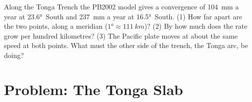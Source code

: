 \begin{exercise}[$\star\star\star$]\label{exo:g11:subduction-zones:15}
Along the Tonga Trench the PB2002 model gives a convergence of
\qty{104}{mm} a year at \ang{23.6}~South and \qty{237}{mm} a year at
\ang{16.5}~South. (1) How far apart are the two points, along a meridian
($\ang{1} \approx \qty{111}{km}$)? (2) By how much does the rate grow per
hundred kilometres? (3) The Pacific plate moves at about the same speed at
both points. What must the other side of the trench, the Tonga arc, be doing?
\end{exercise}

\section{Problem: The Tonga Slab}

